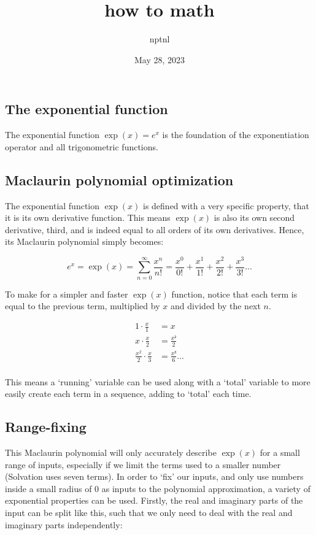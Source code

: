 \documentclass[10pt]{article}
\title{how to math}
\author{nptnl}
\date{May 28, 2023}
\begin{document}
\begin{multicols}{2}

\maketitle

\section{The exponential function}

The exponential function $\exp(x) = e^x$ is the foundation of the exponentiation operator and all trigonometric functions.

\subsection{Maclaurin polynomial optimization}

The exponential function $\exp(x)$ is defined with a very specific property, that it is its own derivative function. This means $\exp(x)$ is also its own second derivative, third, and is indeed equal to all orders of its own derivatives. Hence, its Maclaurin polynomial simply becomes:

\[
    e^x = \exp(x) = ∑_{n=0}^∞ \frac{x^n}{n!} = \frac{x^0}{0!} + \frac{x^1}{1!} + \frac{x^2}{2!} + \frac{x^3}{3!} ...
\]

To make for a simpler and faster $\exp(x)$ function, notice that each term is equal to the previous term, multiplied by $x$ and divided by the next $n$.

\begin{align*}
    1 · \frac{x}{1} &= x \\
    x · \frac{x}{2} &= \frac{x²}{2} \\
    \frac{x^2}{2} · \frac{x}{3} &= \frac{x³}{6} ... \\
\end{align*}

This means a `running' variable can be used along with a `total' variable to more easily create each term in a sequence, adding to `total' each time.

\subsection{Range-fixing}

This Maclaurin polynomial will only accurately describe $\exp(x)$ for a small range of inputs, especially if we limit the terms used to a smaller number (Solvation uses seven terms). In order to `fix' our inputs, and only use numbers inside a small radius of 0 as inputs to the polynomial approximation, a variety of exponential properties can be used. Firstly, the real and imaginary parts of the input can be split like this, such that we only need to deal with the real and imaginary parts independently:


\end{multicols}
\end{document}
